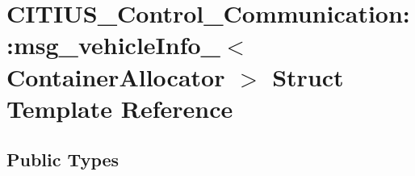 \hypertarget{struct_c_i_t_i_u_s___control___communication_1_1msg__vehicle_info__}{\section{\-C\-I\-T\-I\-U\-S\-\_\-\-Control\-\_\-\-Communication\-:\-:msg\-\_\-vehicle\-Info\-\_\-$<$ \-Container\-Allocator $>$ \-Struct \-Template \-Reference}
\label{struct_c_i_t_i_u_s___control___communication_1_1msg__vehicle_info__}
}
\subsection*{\-Public \-Types}
